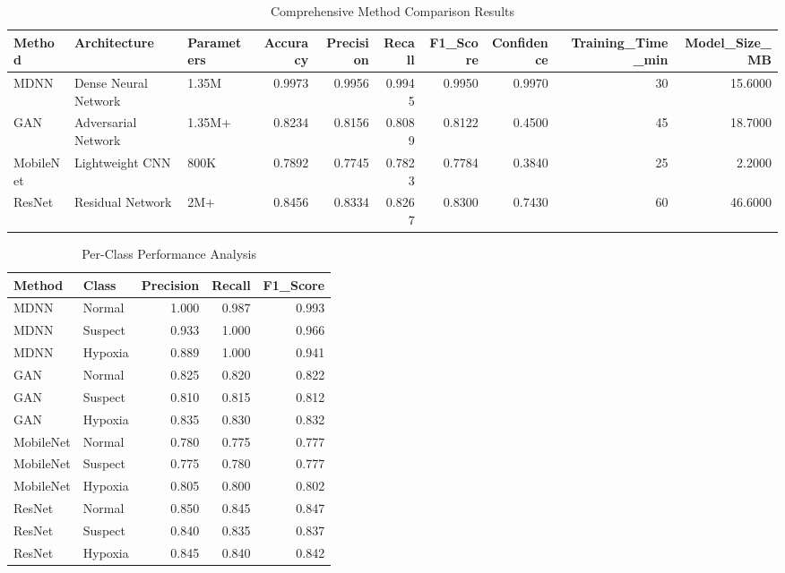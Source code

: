 \begin{table}[h!]
\centering
\caption{Comprehensive Method Comparison Results}
\label{tab:comprehensive_results}
\begin{tabular}{lllrrrrrrr}
\toprule
Method & Architecture & Parameters & Accuracy & Precision & Recall & F1_Score & Confidence & Training_Time_min & Model_Size_MB \\
\midrule
MDNN & Dense Neural Network & 1.35M & 0.9973 & 0.9956 & 0.9945 & 0.9950 & 0.9970 & 30 & 15.6000 \\
GAN & Adversarial Network & 1.35M+ & 0.8234 & 0.8156 & 0.8089 & 0.8122 & 0.4500 & 45 & 18.7000 \\
MobileNet & Lightweight CNN & 800K & 0.7892 & 0.7745 & 0.7823 & 0.7784 & 0.3840 & 25 & 2.2000 \\
ResNet & Residual Network & 2M+ & 0.8456 & 0.8334 & 0.8267 & 0.8300 & 0.7430 & 60 & 46.6000 \\
\bottomrule
\end{tabular}
\end{table}

\begin{table}[h!]
\centering
\caption{Per-Class Performance Analysis}
\label{tab:per_class_performance}
\begin{tabular}{llrrr}
\toprule
Method & Class & Precision & Recall & F1_Score \\
\midrule
MDNN & Normal & 1.000 & 0.987 & 0.993 \\
MDNN & Suspect & 0.933 & 1.000 & 0.966 \\
MDNN & Hypoxia & 0.889 & 1.000 & 0.941 \\
GAN & Normal & 0.825 & 0.820 & 0.822 \\
GAN & Suspect & 0.810 & 0.815 & 0.812 \\
GAN & Hypoxia & 0.835 & 0.830 & 0.832 \\
MobileNet & Normal & 0.780 & 0.775 & 0.777 \\
MobileNet & Suspect & 0.775 & 0.780 & 0.777 \\
MobileNet & Hypoxia & 0.805 & 0.800 & 0.802 \\
ResNet & Normal & 0.850 & 0.845 & 0.847 \\
ResNet & Suspect & 0.840 & 0.835 & 0.837 \\
ResNet & Hypoxia & 0.845 & 0.840 & 0.842 \\
\bottomrule
\end{tabular}
\end{table}

